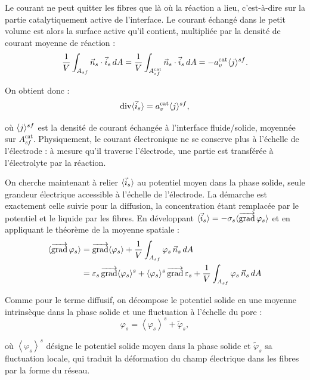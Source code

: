 Le courant ne peut quitter les fibres que là où la réaction a lieu, c'est-à-dire
sur la partie catalytiquement active de l'interface. Le courant échangé dans
le petit volume est alors la surface active qu'il contient, multipliée par la
densité de courant moyenne de réaction :
\begin{equation}
\frac{1}{V}\int_{A_{sf}} \vec{n}_s \cdot \vec{i}_s\, dA
=
\frac{1}{V}\int_{A_{sf}^{\mathrm{cat}}} \vec{n}_s \cdot \vec{i}_s\, dA
=
-a_v^{\mathrm{cat}} \langle j \rangle^{sf}.
\end{equation}

On obtient donc :
\begin{equation}
\operatorname{div} \langle \vec{i}_s \rangle
=
a_v^{\mathrm{cat}} \langle j \rangle^{sf},
\end{equation}

où $\langle j \rangle^{sf}$ est la densité de courant échangée à l'interface
fluide/solide, moyennée sur $A_{sf}^{\mathrm{cat}}$. Physiquement, le courant
électronique ne se conserve plus à l'échelle de l'électrode : à mesure qu'il
traverse l'électrode, une partie est transférée à l'électrolyte par la
réaction.

On cherche maintenant à relier $\langle \vec{i}_s \rangle$ au potentiel moyen dans la
phase solide, seule grandeur électrique accessible à l'échelle de
l'électrode. La démarche est exactement celle suivie pour la diffusion, la
concentration étant remplacée par le potentiel et le liquide par les fibres.
En développant
$\langle \vec{i}_s \rangle = -\sigma_s \langle \mathop{\overrightarrow{\operatorname{grad}}}\nolimits\varphi_s \rangle$ et en appliquant le théorème
de la moyenne spatiale :
\begin{align}
\langle \mathop{\overrightarrow{\operatorname{grad}}}\nolimits\varphi_s \rangle
&= \mathop{\overrightarrow{\operatorname{grad}}}\nolimits\langle \varphi_s \rangle + \frac{1}{V}\int_{A_{sf}} \varphi_s\,\vec{n}_s\, dA \notag\\
&= \varepsilon_s \mathop{\overrightarrow{\operatorname{grad}}}\nolimits\langle \varphi_s \rangle^s + \langle \varphi_s \rangle^s \mathop{\overrightarrow{\operatorname{grad}}}\nolimits\varepsilon_s + \frac{1}{V}\int_{A_{sf}} \varphi_s\,\vec{n}_s\, dA
\end{align}

Comme pour le terme diffusif, on décompose le potentiel solide en une moyenne
intrinsèque dans la phase solide et une fluctuation à l'échelle du pore :
\begin{equation}
\varphi_s
=
\left\langle \varphi_s \right\rangle^s
+
\widetilde{\varphi}_s ,
\end{equation}

où $\left\langle \varphi_s \right\rangle^s$ désigne le potentiel solide
moyen dans la phase solide et $\widetilde{\varphi}_s$ sa fluctuation locale,
qui traduit la déformation du champ électrique dans les fibres par la forme du
réseau.

